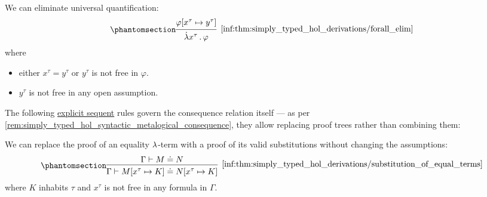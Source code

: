 \begin{proposition}
\begin{thmenum}[series=thm:simply_typed_hol_derivations]
     We can eliminate universal quantification:
    \begin{equation*}\taglabel[\ensuremath{ \logic{HOL}_{\forall+} }]{inf:thm:simply_typed_hol_derivations/forall_intro}
      \begin{prooftree}
        \hypo{ \varphi[x^\tau \mapsto y^\tau] }
        \infer1[\ref{inf:thm:simply_typed_hol_derivations/forall_elim}]{ \qabs {x^\tau} \varphi },
      \end{prooftree}
    \end{equation*}
    where
    \begin{itemize}
      \item either \( x^\tau = y^\tau \) or \( y^\tau \) is not free in \( \varphi \).
      \item \( y^\tau \) is not free in any open assumption.
    \end{itemize}
  \end{thmenum}

  The following \hyperref[rem:natural_deduction_explicit_sequents]{explicit sequent} rules govern the consequence relation itself --- as per \cref{rem:simply_typed_hol_syntactic_metalogical_consequence}, they allow replacing proof trees rather than combining them:
  \begin{thmenum}[resume=thm:simply_typed_hol_derivations]
     We can replace the proof of an equality \( {\mathrm \lambda} \)-term with a proof of its valid substitutions without changing the assumptions:
    \begin{equation*}\taglabel[\ensuremath{ \logic{HOL}_{\mapsto}^\vdash }]{inf:thm:simply_typed_hol_derivations/substitution_of_equal_terms}
      \begin{prooftree}
        \hypo{ \Gamma \vdash M \syneq N }
        \infer1[\ref{inf:thm:simply_typed_hol_derivations/substitution_of_equal_terms}]{ \Gamma \vdash M[x^\tau \mapsto K] \syneq N[x^\tau \mapsto K] },
      \end{prooftree}
    \end{equation*}
    where \( K \) inhabits \( \tau \) and \( x^\tau \) is not free in any formula in \( \Gamma \).
  \end{thmenum}


\end{proposition}
